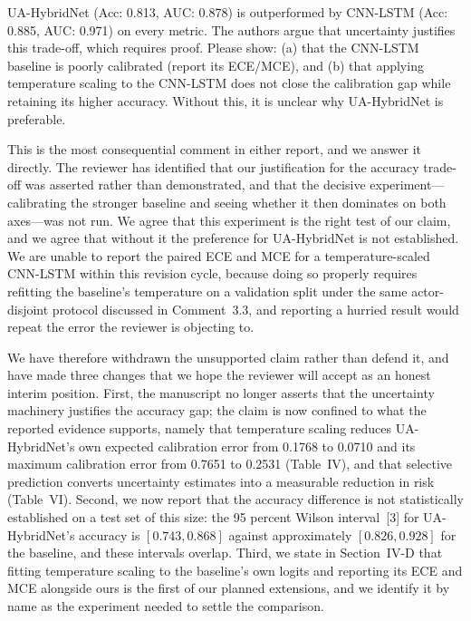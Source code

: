 
\begin{reviewercomment}
UA-HybridNet (Acc: 0.813, AUC: 0.878) is outperformed by CNN-LSTM (Acc:
0.885, AUC: 0.971) on every metric. The authors argue that uncertainty
justifies this trade-off, which requires proof. Please show: (a) that the
CNN-LSTM baseline is poorly calibrated (report its ECE/MCE), and (b) that
applying temperature scaling to the CNN-LSTM does not close the
calibration gap while retaining its higher accuracy. Without this, it is
unclear why UA-HybridNet is preferable.
\end{reviewercomment}

\response This is the most consequential comment in either report, and we
answer it directly. The reviewer has identified that our justification
for the accuracy trade-off was asserted rather than demonstrated, and
that the decisive experiment---calibrating the stronger baseline and
seeing whether it then dominates on both axes---was not run. We agree
that this experiment is the right test of our claim, and we agree that
without it the preference for UA-HybridNet is not established. We are
unable to report the paired ECE and MCE for a temperature-scaled CNN-LSTM
within this revision cycle, because doing so properly requires refitting
the baseline's temperature on a validation split under the same
actor-disjoint protocol discussed in Comment~3.3, and reporting a
hurried result would repeat the error the reviewer is objecting to.

We have therefore withdrawn the unsupported claim rather than defend it,
and have made three changes that we hope the reviewer will accept as an
honest interim position. First, the manuscript no longer asserts that the
uncertainty machinery justifies the accuracy gap; the claim is now
confined to what the reported evidence supports, namely that temperature
scaling reduces UA-HybridNet's own expected calibration error from 0.1768
to 0.0710 and its maximum calibration error from 0.7651 to 0.2531
(Table~IV), and that selective prediction converts uncertainty estimates
into a measurable reduction in risk (Table~VI). Second, we now report
that the accuracy difference is not statistically established on a test
set of this size: the 95 percent Wilson interval~[3] for
UA-HybridNet's accuracy is $[0.743, 0.868]$ against approximately
$[0.826, 0.928]$ for the baseline, and these intervals overlap. Third, we
state in Section~IV-D that fitting temperature scaling to the baseline's
own logits and reporting its ECE and MCE alongside ours is the first of
our planned extensions, and we identify it by name as the experiment
needed to settle the comparison.

